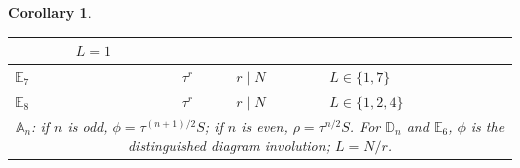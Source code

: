 \documentclass[12pt]{article}
\theoremstyle{plain}
\newtheorem{Coro}[Def]{Corollary}
\theoremstyle{definition}
\begin{document}
\begin{Coro}
\begin{center}
\begin{tabular}{p{}|p{}|p{}|p{}|p{}}
& \(L=1\)\\
\hline
\(\mathbb E_7\)
& 
& \(\tau^r\)
& \(r\mid N\)
& \(L\in\{1,7\}\)\\
\hline
\(\mathbb E_8\)
& 
& \(\tau^r\)
& \(r\mid N\)
& \(L\in\{1,2,4\}\)\\
\hline
\multicolumn{5}{c}{\parbox{0.88\textwidth}{\(\mathbb A_n\): if \(n\) is odd,
\(\phi=\tau^{(n+1)/2}S\); if \(n\) is even, \(\rho=\tau^{n/2}S\).
For \(\mathbb D_n\) and \(\mathbb E_6\), \(\phi\) is the distinguished diagram
involution; $L=N/r$.}}\\
\bottomrule
\end{tabular}
\vspace{.5em}
\label{tab:CY-conditions}
\end{center} 
\end{Coro}
\end{document}
